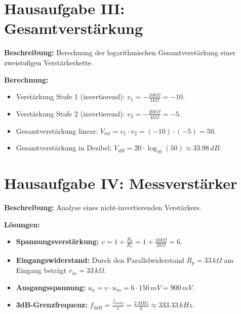 \documentclass{article}
\begin{document}
\section*{Hausaufgabe III: Gesamtverstärkung}
\textbf{Beschreibung:} Berechnung der logarithmischen Gesamtverstärkung einer zweistufigen Verstärkerkette.

\textbf{Berechnung:}
\begin{itemize}
    \item Verstärkung Stufe 1 (invertierend): $v_1 = -\frac{10k\Omega}{1k\Omega} = -10$.
    \item Verstärkung Stufe 2 (invertierend): $v_2 = -\frac{20k\Omega}{4k\Omega} = -5$.
    \item Gesamtverstärkung linear: $V_{tot} = v_1 \cdot v_2 = (-10) \cdot (-5) = 50$.
    \item Gesamtverstärkung in Dezibel: $V_{dB} = 20 \cdot \log_{10}(50) \approx 33.98\,dB$.
\end{itemize}

\section*{Hausaufgabe IV: Messverstärker}
\textbf{Beschreibung:} Analyse eines nicht-invertierenden Verstärkers.

\textbf{Lösungen:}
\begin{itemize}
    \item \textbf{Spannungsverstärkung:} $v = 1 + \frac{R_2}{R_1} = 1 + \frac{10k\Omega}{2k\Omega} = 6$.
    \item \textbf{Eingangswiderstand:} Durch den Parallelwiderstand $R_p = 33\,k\Omega$ am Eingang beträgt $r_{in} = 33\,k\Omega$.
    \item \textbf{Ausgangsspannung:} $u_a = v \cdot u_{in} = 6 \cdot 150\,mV = 900\,mV$.
    \item \textbf{3dB-Grenzfrequenz:} $f_{3dB} = \frac{f_{unity}}{v} = \frac{2\,MHz}{6} \approx 333.33\,kHz$.
\end{itemize}
\end{document}
